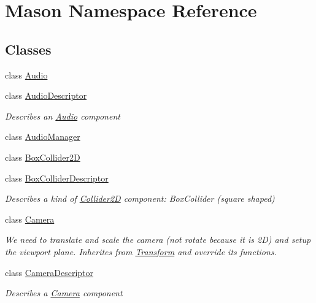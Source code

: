\hypertarget{namespace_mason}{}\section{Mason Namespace Reference}
\label{namespace_mason}
\subsection*{Classes}
\begin{DoxyCompactItemize}
\item 
class \hyperlink{class_mason_1_1_audio}{Audio}
\item 
class \hyperlink{class_mason_1_1_audio_descriptor}{Audio\+Descriptor}
\begin{DoxyCompactList}\small\item\em Describes an \hyperlink{class_mason_1_1_audio}{Audio} component ~\newline
 \end{DoxyCompactList}\item 
class \hyperlink{class_mason_1_1_audio_manager}{Audio\+Manager}
\item 
class \hyperlink{class_mason_1_1_box_collider2_d}{Box\+Collider2D}
\item 
class \hyperlink{class_mason_1_1_box_collider_descriptor}{Box\+Collider\+Descriptor}
\begin{DoxyCompactList}\small\item\em Describes a kind of \hyperlink{class_mason_1_1_collider2_d}{Collider2D} component\+: Box\+Collider (square shaped) ~\newline
 \end{DoxyCompactList}\item 
class \hyperlink{class_mason_1_1_camera}{Camera}
\begin{DoxyCompactList}\small\item\em We need to translate and scale the camera (not rotate because it is 2D) and setup the viewport plane. Inherites from \hyperlink{class_mason_1_1_transform}{Transform} and override its functions. \end{DoxyCompactList}\item 
class \hyperlink{class_mason_1_1_camera_descriptor}{Camera\+Descriptor}
\begin{DoxyCompactList}\small\item\em Describes a \hyperlink{class_mason_1_1_camera}{Camera} component ~\newline
 \end{DoxyCompactList}\item 

\end{DoxyCompactItemize}
